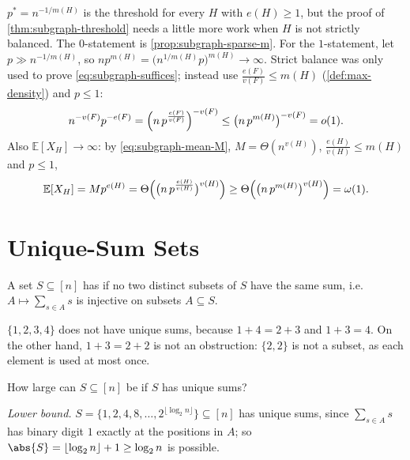 \begin{remark}\label{rmk:subgraph-threshold-general}
    \(p^{*} = n^{-1/m(H)}\) is the threshold for every \(H\) with \(e(H) \ge 1\), but the proof of \autoref{thm:subgraph-threshold} needs a little more work when \(H\) is not strictly balanced. The \(0\)-statement is \autoref{prop:subgraph-sparse-m}. For the \(1\)-statement, let \(p \gg n^{-1/m(H)}\), so \(n p^{m(H)} = \bigl( n^{1/m(H)} p \bigr)^{m(H)} \to \infty\). Strict balance was only used to prove \eqref{eq:subgraph-suffices}; instead use \(\frac{e(F)}{v(F)} \le m(H)\) (\autoref{def:max-density}) and \(p \le 1\):
    \[
        n^{-v(F)} p^{-e(F)} = \Bigl( n\,p^{\frac{e(F)}{v(F)}} \Bigr)^{-v(F)} \le \bigl( n\,p^{m(H)} \bigr)^{-v(F)} = o(1).
    \]
    Also \(\mathbb{E}[X_H] \to \infty\): by \eqref{eq:subgraph-mean-M}, \(M = \Theta(n^{v(H)})\), \(\frac{e(H)}{v(H)} \le m(H)\) and \(p \le 1\),
    \[
        \mathbb{E}[X_H] = M p^{e(H)} = \Theta\Bigl( \bigl( n\, p^{\frac{e(H)}{v(H)}} \bigr)^{v(H)} \Bigr) \ge \Theta\Bigl( \bigl( n\, p^{m(H)} \bigr)^{v(H)} \Bigr) = \omega(1).
    \]
\end{remark}

\section{Unique-Sum Sets}\label{sec:unique-sums}

\begin{definition}\label{def:unique-sums}
    A set \(S \subseteq [n]\) has  if no two distinct subsets of \(S\) have the same sum, i.e.\ \(A \mapsto \sum_{s \in A} s\) is injective on subsets \(A \subseteq S\).
\end{definition}

\begin{eg}\label{eg:unique-sums}
    \(\{1,2,3,4\}\) does not have unique sums, because \(1 + 4 = 2 + 3\) and \(1 + 3 = 4\). On the other hand, \(1 + 3 = 2 + 2\) is not an obstruction: \(\{2,2\}\) is not a subset, as each element is used at most once.
\end{eg}

\begin{question}\label{q:unique-sums}
    How large can \(S \subseteq [n]\) be if \(S\) has unique sums?
\end{question}

\emph{Lower bound.} \(S = \{1, 2, 4, 8, \ldots, 2^{\lfloor \log_2 n \rfloor}\} \subseteq [n]\) has unique sums, since \(\sum_{s \in A} s\) has binary digit \(1\) exactly at the positions in \(A\); so \(\abs{S} = \lfloor \log_2 n \rfloor + 1 \ge \log_2 n\) is possible.

